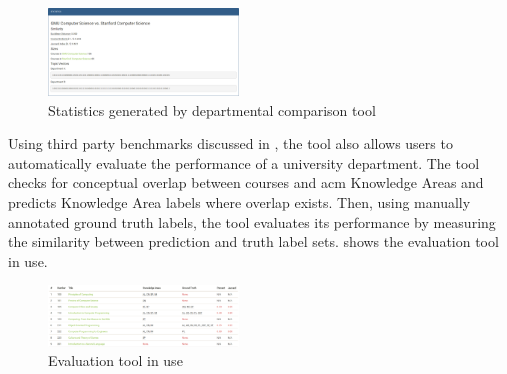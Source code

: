 
\begin{figure}
  \centering
  \includegraphics[width=0.45\textwidth]{figures/screenshots/compare/statistics.png}
  \caption{Statistics generated by departmental comparison tool\label{fig:statistics}}
\end{figure}


Using third party benchmarks discussed in , the tool also allows users to automatically evaluate the performance of a university department.
The tool checks for conceptual overlap between courses and \ac{acm} Knowledge Areas and predicts Knowledge Area labels where overlap exists.
Then, using manually annotated ground truth labels, the tool evaluates its performance by measuring the similarity between prediction and truth label sets.
 shows the evaluation tool in use.


\begin{figure}
  \centering
  \includegraphics[width=0.45\textwidth]{figures/screenshots/evaluate/evaluation.png}
  \caption{Evaluation tool in use\label{fig:evaluation}}
\end{figure}

